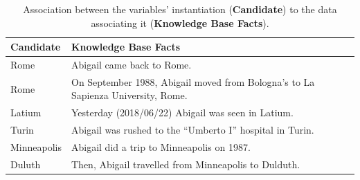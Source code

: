 
\begin{table}
	\caption{Association between the variables' instantiation (\textup{\textbf{Candidate}}) to the data associating it (\textup{\textbf{Knowledge Base Facts}}).}
	\begin{tabular}{lp{}}
		\toprule
		\textbf{Candidate} & \textbf{Knowledge Base Facts}\\
		\midrule
		Rome & Abigail came back to Rome.\\
		Rome & On September 1988, Abigail moved from Bologna's to La Sapienza University, Rome.\\
		Latium & Yesterday (2018/06/22) Abigail was seen in Latium.\\
		Turin & Abigail was rushed to the ``Umberto I'' hospital in Turin.\\
		Minneapolis & Abigail did a trip to Minneapolis on 1987.\\
		Duluth & Then, Abigail travelled from Minneapolis to Dulduth.\\
		\bottomrule
	\end{tabular}
	\label{tab:datahyp}
\end{table} \begin{figure} 
	\centering
	\hfill
	\\
	\hfill
	\\

\end{figure}
